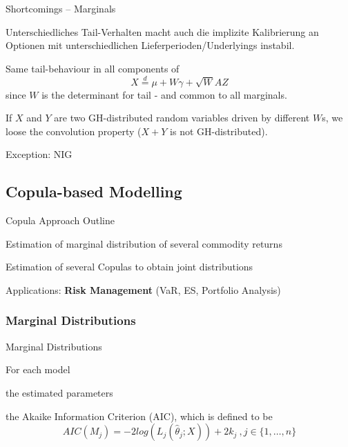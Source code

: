 {Shortcomings -- Marginals} %






	Unterschiedliches Tail-Verhalten macht auch die implizite Kalibrierung an Optionen mit unterschiedlichen Lieferperioden/Underlyings instabil.

	Same tail-behaviour in all components of
$$X\stackrel{d}{=}\mu+W\gamma+\sqrt{W}AZ$$
since $W$ is the determinant for tail - and common to all
marginals.

	If $X$ and $Y$ are two GH-distributed random
variables driven by different $W$s, we loose the convolution
property ($X+Y$ is not GH-distributed).

	Exception: NIG






\subsection{Copula-based Modelling}

{Copula Approach Outline} %






	Estimation of marginal  distribution of several commodity
returns

	Estimation of several Copulas to obtain joint
distributions

	Applications: \textbf{Risk Management} (VaR,
ES, Portfolio Analysis)






\subsubsection{Marginal Distributions}

{Marginal Distributions}

For each model






	the estimated parameters

	the Akaike Information
Criterion (AIC), which is defined to be
    \[AIC(M_j)=-2log(L_j(\hat{\theta}_j; X))+2k_j\ ,j\in\{1,\ldots,n\}\]

